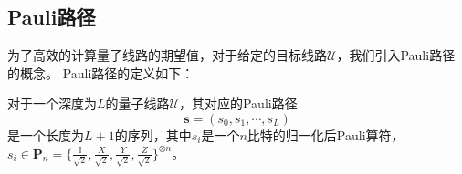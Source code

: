 \subsection{Pauli路径}
为了高效的计算量子线路的期望值，对于给定的目标线路$\mathcal{U}$，我们引入Pauli路径的概念。
Pauli路径的定义如下：

\begin{definition}
    对于一个深度为$L$的量子线路$\mathcal{U}$，其对应的Pauli路径
    \begin{equation}
        \bm{s} = (s_0, s_1, \cdots, s_L)
    \end{equation}
    是一个长度为$L+1$的序列，其中$s_i$是一个$n$比特的归一化后Pauli算符，$s_i \in \bm{P}_n=\{\frac{\mathbb{I}}{\sqrt{2}},\frac{X}{\sqrt{2}},\frac{Y}{\sqrt{2}},\frac{Z}{\sqrt{2}}\}^{\otimes n}$。
\end{definition}





